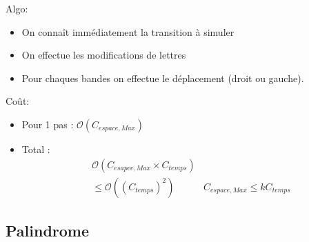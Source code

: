 \documentclass{article}
\theoremstyle{plain}
\theoremstyle{nonumberplain}
\begin{document}
  Algo: 

  \begin{itemize}
    
    \item On connaît immédiatement la transition à simuler

    \item On effectue les modifications de lettres

    \item Pour chaques bandes on effectue le déplacement (droit ou gauche). 
  \end{itemize}

  Coût: \begin{itemize}
    \item Pour 1 pas : $\mathcal{O}(C_{espace, Max})$

    \item Total : \begin{align*}
        & \mathcal{O}(C_{esapce, Max} \times C_{temps}) \\
        & \leq \mathcal{O}((C_{temps})^2)    
        & C_{espace, Max} \leq k C_{temps}
    \end{align*}
  \end{itemize}

\newpage
\subsection{Palindrome}
\end{document}
